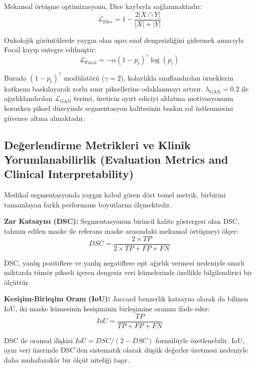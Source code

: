 \documentclass[10pt,journal,compsoc]{IEEEtran}
\begin{document}
Mekansal örtüşme optimizasyonu, Dice kaybıyla sağlanmaktadır:
\begin{equation}
\mathcal{L}_{\text{Dice}} = 1 - \frac{2|X \cap Y|}{|X| + |Y|}
\end{equation}

Onkolojik görüntülerde yaygın olan aşırı sınıf dengesizliğini gidermek amacıyla Focal kayıp entegre edilmiştir:
\begin{equation}
\mathcal{L}_{\text{Focal}} = -\alpha (1 - p_t)^\gamma \log(p_t)
\end{equation}

Burada $(1-p_t)^\gamma$ modülatörü ($\gamma=2$), kolaylıkla sınıflandırılan örneklerin katkısını baskılayarak zorlu sınır piksellerine odaklanmayı artırır. $\lambda_{\text{GAN}}=0.2$ ile ağırlıklandırılan $\mathcal{L}_{\text{GAN}}$ terimi, üreticin ayırt ediciyi aldatma motivasyonunu korurken piksel düzeyinde segmentasyon kalitesinin baskın rol üstlenmesini güvence altına almaktadır.

\subsection{Değerlendirme Metrikleri ve Klinik Yorumlanabilirlik \textnormal{\small{(Evaluation Metrics and Clinical Interpretability)}}}

Medikal segmentasyonda yaygın kabul gören dört temel metrik, birbirini tamamlayan farklı performans boyutlarını ölçmektedir.

\textbf{Zar Katsayısı (DSC):} Segmentasyonun birincil kalite göstergesi olan DSC, tahmin edilen maske ile referans maske arasındaki mekansal örtüşmeyi ölçer:
\begin{equation}
DSC = \frac{2 \times TP}{2 \times TP + FP + FN}
\end{equation}

DSC, yanlış pozitiflere ve yanlış negatiflere eşit ağırlık vermesi nedeniyle sınırlı miktarda tümör pikseli içeren dengesiz veri kümelerinde özellikle bilgilendirici bir ölçüttür.

\textbf{Kesişim-Birleşim Oranı (IoU):} Jaccard benzerlik katsayısı olarak da bilinen IoU, iki maske kümesinin kesişiminin birleşimine oranını ifade eder:
\begin{equation}
IoU = \frac{TP}{TP + FP + FN}
\end{equation}

DSC ile oransal ilişkisi $IoU = DSC/(2 - DSC)$ formülüyle özetlenebilir. IoU, aynı veri üzerinde DSC'den sistematik olarak düşük değerler üretmesi nedeniyle daha muhafazakâr bir ölçüt niteliği taşır.
\end{document}
